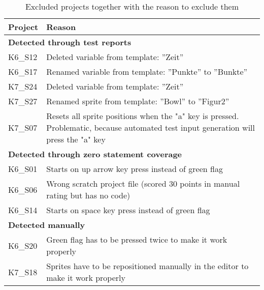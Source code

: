 \begin{table}
    \centering
    \scriptsize
    \begin{tabular}{lp{10.5cm}}
        \toprule
        Project & Reason                                                                          \\
        \midrule
        \multicolumn{2}{l}{\textbf{Detected through test reports}}                                \\
        K6\_S12 & Deleted variable from template: ''Zeit''                                        \\
        K6\_S17 & Renamed variable from template: ''Punkte'' to ''Bunkte''                        \\
        K7\_S24 & Deleted variable from template: ''Zeit''                                        \\
        K7\_S27 & Renamed sprite from template: ''Bowl'' to ''Figur2''                            \\
        K7\_S07 & Resets all sprite positions when the "a" key is pressed.
                  Problematic, because automated test input generation will press the "a" key     \\[1.4\bigskipamount]

        \multicolumn{2}{l}{\textbf{Detected through zero statement coverage}}                     \\
        K6\_S01 & Starts on up arrow key press instead of green flag                              \\
        K6\_S06 & Wrong scratch project file (scored 30 points in manual rating but has no code)  \\
        K6\_S14 & Starts on space key press instead of green flag                                 \\[\medskipamount]

        \multicolumn{2}{l}{\textbf{Detected manually}}                                            \\
        K6\_S20 & Green flag has to be pressed twice to make it work properly                     \\
        K7\_S18 & Sprites have to be repositioned manually in the editor to make it work properly \\
        \bottomrule
    \end{tabular}
    \caption{Excluded projects together with the reason to exclude them}
    \label{tab:excluded_projects}
\end{table}

